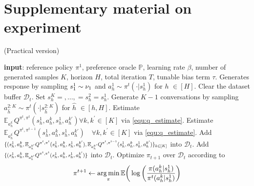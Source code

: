 \section{Supplementary material on experiment}
\begin{algorithm}[t]
\caption{\oomdmethod{} (Practical version)}
\label{alg:forbprac}
\begin{algorithmic} %
    \STATE \textbf{input}:
    reference policy $\pi^1$,
    preference oracle $\mathbb{P}$,
    learning rate $\beta$, number of generated samples $K$, 
    horizon $H$, total iteration $T$, tunable bias term $\tau$.
        \STATE Generates response by sampling $s_1^1 \sim \nu_1$ and $a_h^1 \sim   \pi^t(\cdot|s_h^1)$ for $h$ $\in [H]$. 
        \STATE Clear the dataset buffer $\mathcal{D}_t$.
        \STATE Set $s_{h}^{K} =,\dots,=s_{h}^{2}=s_{h}^{1} $.
        \STATE Generate $K-1$ conversations by sampling $a_{\hat{h}}^{2:K} \sim  \pi^t(\cdot|s_{\hat{h}}^{2:K})$ for $\hat{h}$ $\in [h,H]$. 
        \STATE Estimate $\mathbb{E}_{a_h^{k^\prime}} Q^{\pi^t,\pi^t}(s_h^1,a_h^{k},s_h^1,a_h^{k'})  \forall k,k^\prime \in [K]$  
        via \cref{equ:q_estimate}.
        \STATE Estimate $
       \mathbb{E}_{a_h^{k^\prime}} Q^{\pi^{t},\pi^{t-1}}(s_h^1,a_h^{k},s_h^1,a_h^{k'})\quad
        \forall k,k^\prime \in [K]$
        via \cref{equ:q_estimate}.
        \STATE Add
        $
          \scalemath{0.8}{
        \{
        (s_h^1, a_h^k,
        \mathbb{E}_{a_h^{k^\prime}}Q^{\pi^t,\pi^t}(s_h^1,a_h^k,s_h^1,a_h^{k^\prime}) ,
        \mathbb{E}_{a_h^{k^\prime}}Q^{\pi^{t},\pi^{t-1}}(s_h^1,a_h^k,s_h^1,a_h^{k^\prime})
        \}
        _{k\in[K]}}
        $
        into  $\mathcal{D}_t$.
        \ELSE
        \STATE 
        Add
        $
          \scalemath{0.8}{
        \{
        (s_h^1, a_h^k,
        \mathbb{E}_{a_h^{k^\prime}}Q^{\pi^t,\pi^t}(s_h^1,a_h^k,s_h^1,a_h^{k^\prime})
        \}
        }
        $
        into  $\mathcal{D}_t$.
      \ENDIF
        \ENDFOR
        \STATE Optimize $\pi_{{t+1}}$ over $\mathcal{D}_t$ according to 
        \begin{align*}
        \scalemath{1}{
            \pi^{t+1}
            \leftarrow 
            \argmin_{\pi}
            \mathbb{E}
            \bigg(
            \log \bigg(\frac{\pi(a_h^k|s_h^1)}{\pi^t(a_h^k|s_h^1)}\bigg)
}
\end{align*}
\end{algorithmic}
\end{algorithm}
